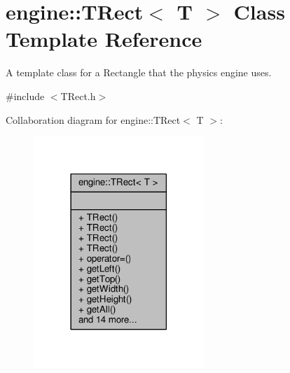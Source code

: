 \hypertarget{classengine_1_1TRect}{\section{engine\-:\-:T\-Rect$<$ T $>$ Class Template Reference}
\label{classengine_1_1TRect}
}


A template class for a Rectangle that the physics engine uses.  




{\ttfamily \#include $<$T\-Rect.\-h$>$}



Collaboration diagram for engine\-:\-:T\-Rect$<$ T $>$\-:\nopagebreak
\begin{figure}[H]
\begin{center}
\leavevmode
\includegraphics[width=182pt]{classengine_1_1TRect__coll__graph}
\end{center}
\end{figure}
